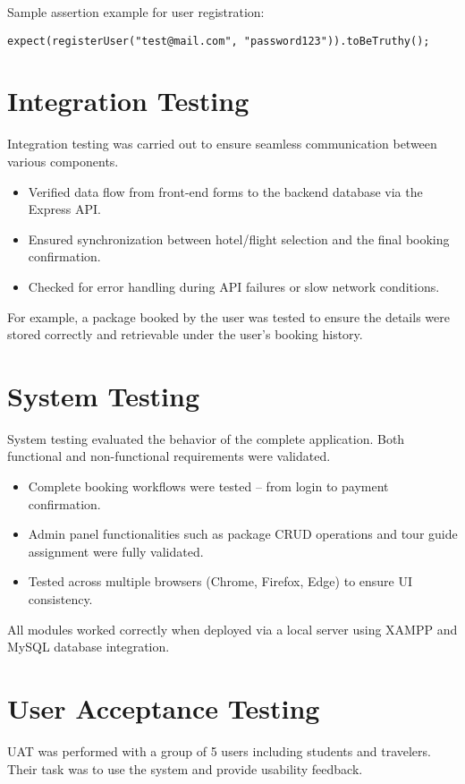 Sample assertion example for user registration:
\begin{verbatim}
expect(registerUser("test@mail.com", "password123")).toBeTruthy();
\end{verbatim}

\section{Integration Testing}
Integration testing was carried out to ensure seamless communication between various components.

\begin{itemize}
    \item Verified data flow from front-end forms to the backend database via the Express API.
    \item Ensured synchronization between hotel/flight selection and the final booking confirmation.
    \item Checked for error handling during API failures or slow network conditions.
\end{itemize}

For example, a package booked by the user was tested to ensure the details were stored correctly and retrievable under the user's booking history.

\section{System Testing}
System testing evaluated the behavior of the complete application. Both functional and non-functional requirements were validated.

\begin{itemize}
    \item Complete booking workflows were tested – from login to payment confirmation.
    \item Admin panel functionalities such as package CRUD operations and tour guide assignment were fully validated.
    \item Tested across multiple browsers (Chrome, Firefox, Edge) to ensure UI consistency.
\end{itemize}

All modules worked correctly when deployed via a local server using XAMPP and MySQL database integration.

\section{User Acceptance Testing}
UAT was performed with a group of 5 users including students and travelers. Their task was to use the system and provide usability feedback.

